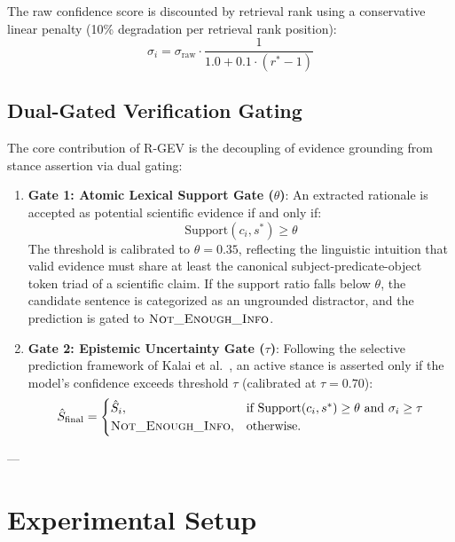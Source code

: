\documentclass[10pt,journal,compsoc]{IEEEtran}
\begin{document}
The raw confidence score is discounted by retrieval rank using a conservative linear penalty (10\% degradation per retrieval rank position):
\begin{equation}
    \sigma_i = \sigma_{\text{raw}} \cdot \frac{1}{1.0 + 0.1 \cdot (r^* - 1)}
\end{equation}

\subsection{Dual-Gated Verification Gating}
The core contribution of R-GEV is the decoupling of evidence grounding from stance assertion via dual gating:

\begin{enumerate}
    \item \textbf{Gate 1: Atomic Lexical Support Gate ($\theta$)}:
    An extracted rationale is accepted as potential scientific evidence if and only if:
    \begin{equation}
        \text{Support}(c_i, s^*) \ge \theta
    \end{equation}
    The threshold is calibrated to $\theta = 0.35$, reflecting the linguistic intuition that valid evidence must share at least the canonical subject-predicate-object token triad of a scientific claim. If the support ratio falls below $\theta$, the candidate sentence is categorized as an ungrounded distractor, and the prediction is gated to $\textsc{Not\_Enough\_Info}$.
    
    \item \textbf{Gate 2: Epistemic Uncertainty Gate ($\tau$)}:
    Following the selective prediction framework of Kalai et al.~\cite{kalai2026evaluating}, an active stance is asserted only if the model's confidence exceeds threshold $\tau$ (calibrated at $\tau = 0.70$):
    \begin{equation}
        \hat{S}_{\text{final}} = \begin{cases}
            \hat{S}_i, & \text{if } \text{Support}(c_i, s^*) \ge \theta \text{ and } \sigma_i \ge \tau \\
            \textsc{Not\_Enough\_Info}, & \text{otherwise.}
        \end{cases}
    \end{equation}
\end{enumerate}

---

\section{Experimental Setup}
\end{document}
